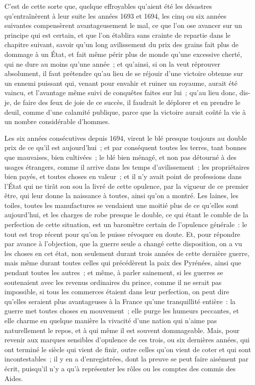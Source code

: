 \documentclass[french,twoside]{book} %
\begin{document}
C’est de cette sorte que, quelque effroyables qu’aient été les désastres qu’entraînèrent à leur suite les années 1693 et 1694, les cinq ou six années suivantes compensèrent avantageusement le mal, ce que l’on ose avancer sur un principe qui est certain, et que l’on établira sans crainte de repartie dans le chapitre suivant, savoir qu’un long avilissement du prix des grains fait plus de dommage à un État, et fait même périr plus de monde qu’une excessive cherté, qui ne dure au moins qu’une année ; et qu’ainsi, si on la veut réprouver absolument, il faut prétendre qu’au lieu de se réjouir d’une victoire obtenue sur un ennemi puissant qui, venant pour envahir et ruiner un royaume, aurait été vaincu, et l’avantage même suivi de conquêtes faites sur lui ; qu’au lieu donc, dis-je, de faire des feux de joie de ce succès, il faudrait le déplorer et en prendre le deuil, comme d’une calamité publique, parce que la victoire aurait coûté la vie à un nombre considérable d’hommes.\par
Les six années consécutives depuis 1694, virent le blé presque toujours au double prix de ce qu’il est aujourd’hui ; et par conséquent toutes les terres, tant bonnes que mauvaises, bien cultivées ; le blé bien ménagé, et non pas détourné à des usages étrangers, comme il arrive dans les temps d’avilissement ; les propriétaires bien payés, et toutes choses en valeur ; et il n’y avait point de professions dans l’État qui ne tirât son sou la livré de cette opulence, par la vigueur de ce premier être, qui leur donne la naissance à toutes, ainsi qu’on a montré. Les laines, les toiles, toutes les manufactures se vendaient une moitié plus de ce qu’elles sont aujourd’hui, et les charges de robe presque le double, ce qui étant le comble de la perfection de cette situation, est un baromètre certain de l’opulence générale : le tout est trop récent pour qu’on le puisse révoquer en doute. Et, pour répondre par avance à l’objection, que la guerre seule a changé cette disposition, on a vu les choses en cet état, non seulement durant trois années de cette dernière guerre, mais même durant toutes celles qui précédèrent la paix des Pyrénées, ainsi que pendant toutes les autres ; et même, à parler sainement, si les guerres se soutenaient avec les revenus ordinaires du prince, comme il ne serait pas impossible, si tous les commerces étaient dans leur perfection, on peut dire qu’elles seraient plus avantageuses à la France qu’une tranquillité entière : la guerre met toutes choses en mouvement ; elle purge les humeurs peccantes, et elle charme en quelque manière la vivacité d’une nation qui n’aime pas naturellement le repos, et à qui même il est souvent dommageable. Mais, pour revenir aux marques sensibles d’opulence de ces trois, ou six dernières années, qui ont terminé le siècle qui vient de finir, outre celles qu’on vient de coter et qui sont incontestables ; il y en a d’enregistrées, dont la preuve se peut faire aisément par écrit, puisqu’il n’y a qu’à représenter les rôles ou les comptes des commis des Aides.\par
\end{document}
